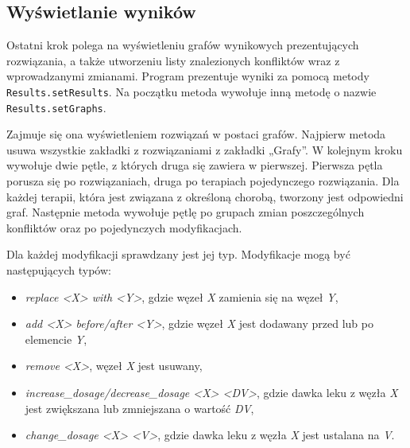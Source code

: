 
\subsection{Wyświetlanie wyników}
Ostatni krok polega na wyświetleniu grafów wynikowych prezentujących rozwiązania, a także utworzeniu listy znalezionych konfliktów wraz z wprowadzanymi zmianami. Program prezentuje wyniki za pomocą metody \texttt{Results.setResults}. Na początku metoda wywołuje inną metodę o nazwie \texttt{Results.setGraphs}. 

Zajmuje się ona wyświetleniem rozwiązań w postaci grafów. Najpierw metoda usuwa wszystkie zakładki z rozwiązaniami z zakładki „Grafy”. W kolejnym kroku wywołuje dwie pętle, z których druga się zawiera w pierwszej. Pierwsza pętla porusza się po rozwiązaniach, druga po terapiach pojedynczego rozwiązania. Dla każdej terapii, która jest związana z określoną chorobą, tworzony jest odpowiedni graf. Następnie metoda wywołuje pętlę po grupach zmian poszczególnych konfliktów oraz po pojedynczych modyfikacjach. 

Dla każdej modyfikacji sprawdzany jest jej typ. Modyfikacje mogą być następujących typów:
\begin{itemize}
\item \textit{replace <X> with <Y>}, gdzie węzeł \textit{X} zamienia się na węzeł \textit{Y},
\item \textit{add <X> before/after <Y>}, gdzie węzeł \textit{X} jest dodawany przed lub po elemencie \textit{Y},
\item \textit{remove <X>}, węzeł \textit{X} jest usuwany,
\item \textit{increase\_dosage/decrease\_dosage <X> <DV>}, gdzie dawka leku z węzła \textit{X} jest zwiększana lub zmniejszana o wartość \textit{DV},
\item \textit{change\_dosage <X> <V>}, gdzie dawka leku z węzła \textit{X} jest ustalana na \textit{V}.  
\end{itemize}

